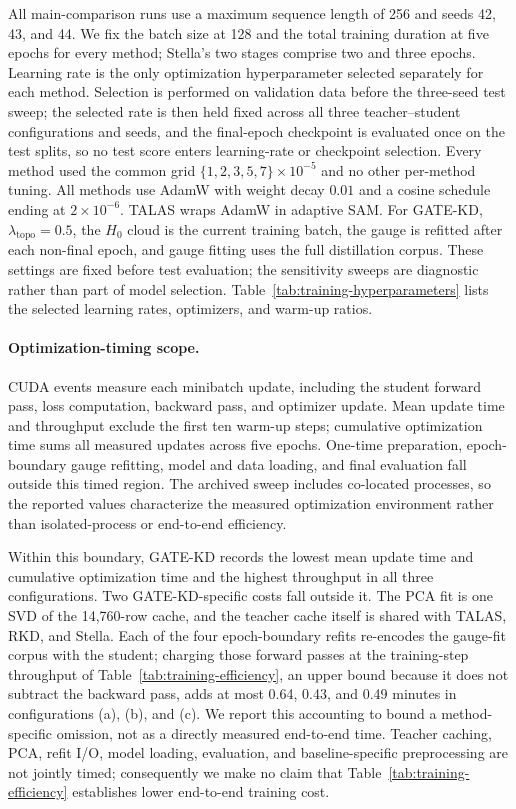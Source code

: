 All main-comparison runs use a maximum sequence length of 256 and seeds 42, 43,
and 44. We fix the batch size at 128 and the total training duration at five
epochs for every method; Stella's two stages comprise two and three epochs.
Learning rate is the only optimization hyperparameter selected separately for
each method. Selection is performed on validation data before the three-seed
test sweep; the selected rate is then held fixed across all three
teacher--student configurations and seeds, and the final-epoch checkpoint is
evaluated once on the test splits, so no test score enters learning-rate or
checkpoint selection. Every method used the common grid
$\{1,2,3,5,7\}\times10^{-5}$ and no other per-method tuning.
All methods use AdamW with weight decay $0.01$ and a cosine schedule ending at
$2\times10^{-6}$. TALAS wraps AdamW in adaptive SAM.
For GATE-KD,
$\lambda_{\mathrm{topo}}=0.5$, the $H_0$
cloud is the current training batch, the gauge is refitted after each non-final
epoch, and gauge fitting uses the full distillation corpus. These settings are
fixed before test evaluation; the sensitivity sweeps are diagnostic rather than
part of model selection. Table~\ref{tab:training-hyperparameters} lists the
selected learning rates, optimizers, and warm-up ratios.



\paragraph{Optimization-timing scope.}
CUDA events measure each minibatch update, including the student forward pass,
loss computation, backward pass, and optimizer update. Mean update time and
throughput exclude the first ten warm-up steps; cumulative optimization time
sums all measured updates across five epochs. One-time preparation,
epoch-boundary gauge refitting, model and data loading, and final evaluation
fall outside this timed region. The archived sweep includes co-located
processes, so the reported values characterize the measured optimization
environment rather than isolated-process or end-to-end efficiency.



Within this boundary, GATE-KD records the lowest mean update time and
cumulative optimization time and the highest throughput in all three
configurations. Two GATE-KD-specific costs fall outside it. The PCA fit is one
SVD of the 14{,}760-row cache, and the teacher cache itself is shared with
TALAS, RKD, and Stella. Each of the four epoch-boundary refits re-encodes the
gauge-fit corpus with the student; charging those forward passes at the
training-step throughput of Table~\ref{tab:training-efficiency}, an upper bound
because it does not subtract the backward pass, adds at most 0.64, 0.43, and
0.49 minutes in configurations (a), (b), and (c). We report this accounting to
bound a method-specific omission, not as a directly measured end-to-end time.
Teacher caching, PCA, refit I/O, model loading, evaluation, and
baseline-specific preprocessing are not jointly timed; consequently we make no
claim that Table~\ref{tab:training-efficiency} establishes lower end-to-end
training cost.

